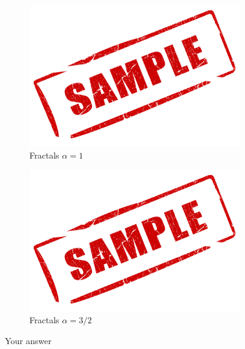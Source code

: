 \documentclass[paper=a4, fontsize=12pt]{scrartcl} %
\numberwithin{equation}{section}       %
\numberwithin{figure}{section}         %
\numberwithin{table}{section}          %
\begin{document}
\begin{figure}[H]
    \centering
    \begin{subfigure}[b]{0.49\textwidth}
        \includegraphics[width=\textwidth]{sample}
        \caption{Fractals $\alpha=1$}
    \end{subfigure}
    \begin{subfigure}[b]{0.49\textwidth}
        \includegraphics[width=\textwidth]{sample}
        \caption{Fractals $\alpha=3/2$}
    \end{subfigure}
    \caption{Your answer}
\end{figure}
\end{document}
